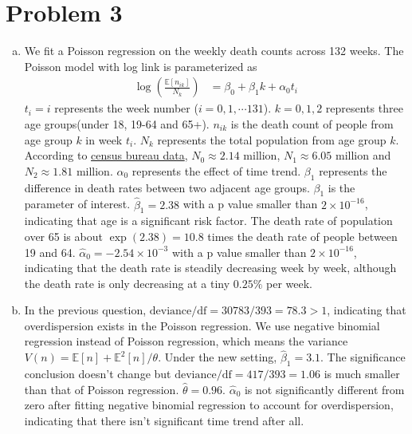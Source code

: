 \documentclass[12pt]{article}
\begin{document}
\section*{Problem 3}

\begin{enumerate}[(a)]
	\item We fit a Poisson regression on the weekly death counts across 132 weeks. The Poisson model with log link is parameterized as
	\begin{align*}
		\log(\frac{\mathbb{E}[n_{ik}]}{N_{k}}) &= \beta_{0} + \beta_{1}k + \alpha_{0} t_{i} 
	\end{align*}
	$t_{i} = i$ represents the week number ($i=0,1,\cdots 131$). $k=0,1,2$ represents three age groups(under 18, 19-64 and 65+).
	$n_{ik}$ is the death count of people from age group $k$ in week $t_{i}$. $N_{k}$ represents the total population from age group $k$. According to \href{https://www.census.gov/quickfacts/MI}{census bureau data}, $N_{0}\approx 2.14$ million, $N_{1} \approx 6.05$ million and  $N_{2}\approx 1.81$ million. $\alpha_0$ represents the effect of time trend.  $\beta_1$ represents the difference in death rates between two adjacent age groups. $\beta_{1}$ is the parameter of interest.  $\hat{\beta}_{1} = 2.38$ with a p value smaller than $2\times 10^{-16}$, indicating that age is a significant risk factor. The death rate of population over 65 is about $\exp(2.38) = 10.8$ times the death rate of people between 19 and 64. $\hat{\alpha}_{0} = -2.54\times 10^{-3}$ with a p value smaller than $2\times 10^{-16}$, indicating that the death rate is steadily decreasing week by week, although the death rate is only decreasing at a tiny $0.25\%$ per week.
	\item In the previous question, $\text{deviance}/\text{df}=30783/393=78.3 > 1$, indicating that overdispersion exists in the Poisson regression. We use negative binomial regression instead of Poisson regression, which means the variance $V(n) = \mathbb{E}[n] +\mathbb{E}^{2}[n]/\theta$. Under the new setting, $\hat{\beta}_{1} = 3.1$. The significance conclusion doesn't change but $\text{deviance}/\text{df}=417/393=1.06$ is much smaller than that of Poisson regression. $\hat{\theta}=0.96$. $\hat{\alpha}_{0}$ is not significantly different from zero after fitting negative binomial regression to account for overdispersion, indicating that there isn't significant time trend after all.
	

\end{enumerate}
\end{document}
